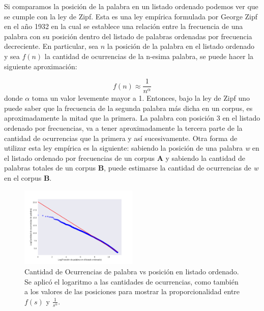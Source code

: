 Si comparamos la posición de la palabra en un listado ordenado podemos ver que se cumple con la ley de Zipf. Esta es una ley empírica formulada por George Zipf en el año 1932 en la cual se establece una relación entre la frecuencia de una palabra con su posición dentro del listado de palabras ordenadas por frecuencia decreciente. En particular, sea $n$ la posición de la palabra en el listado ordenado y sea $f(n)$ la cantidad de ocurrencias de la n-esima palabra, se puede hacer la siguiente aproximación:

$$f(n) \approx \frac{1}{n^{\alpha}}$$
donde $\alpha$ toma un valor levemente mayor a 1.
Entonces, bajo la ley de Zipf uno puede saber que la frecuencia de la segunda palabra más dicha en un corpus, es aproximadamente la mitad que la primera. La palabra con posición 3 en el listado ordenado por frecuencias, va a tener aproximadamente la tercera parte de la cantidad de ocurrencias que la primera y así sucesivamente. Otra forma de utilizar esta ley empírica es la siguiente:
sabiendo la posición de una palabra \textit{w} en el listado ordenado por frecuencias de un corpus \textbf{A} y sabiendo la cantidad de palabras totales de un corpus \textbf{B}, puede estimarse la cantidad de ocurrencias de \textit{w} en el corpus \textbf{B}.

\begin{figure}[!ht]
\centering
\includegraphics[width=0.5\textwidth]{./images/zipf.pdf}
\caption{Cantidad de Ocurrencias de palabra vs posición en listado ordenado. Se aplicó el logaritmo a las cantidades de ocurrencias, como también a los valores de las posiciones para mostrar la proporcionalidad entre $f(s)$ y $\frac{1}{s^{\alpha}}$.} 
\label{fig:zipf} 
\end{figure}





